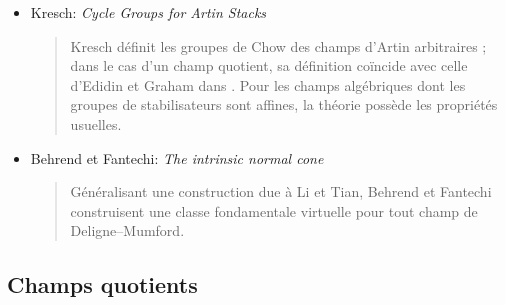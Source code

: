 \begin{itemize}
\begin{quote}
$\CH_i(B \mathbf{G}_m) = \mathbf{Z}$ pour $i \le 0$.
Les auteurs établissent que ces groupes de Chow équivariants possèdent les mêmes
propriétés fonctorielles que les groupes de Chow ordinaires. Ils montrent en
outre qu'un isomorphisme
$[X / G] \cong [Y / H]$ entraîne
$\CH_i([X/G]) = \CH_i([Y/H])$ ; la définition
ne dépend donc pas de la présentation du champ comme champ quotient.
\end{quote}
\item
Kresch: \emph{Cycle Groups for Artin Stacks} \cite{kresch_cycle}
\begin{quote}
Kresch définit les groupes de Chow des champs d'Artin arbitraires ; dans le cas
d'un champ quotient, sa définition coïncide avec celle d'Edidin et Graham dans
\cite{edidin-graham}. Pour les champs algébriques dont les groupes de
stabilisateurs sont affines, la théorie possède les propriétés usuelles.
\end{quote}
\item Behrend et Fantechi: \emph{The intrinsic normal cone}
\cite{behrend-fantechi}
\begin{quote}
Généralisant une construction due à Li et Tian, Behrend et Fantechi construisent
une classe fondamentale virtuelle pour tout champ de Deligne--Mumford.
\end{quote}
\end{itemize}


\subsection{Champs quotients}
\label{subsection-quotient-stacks}

